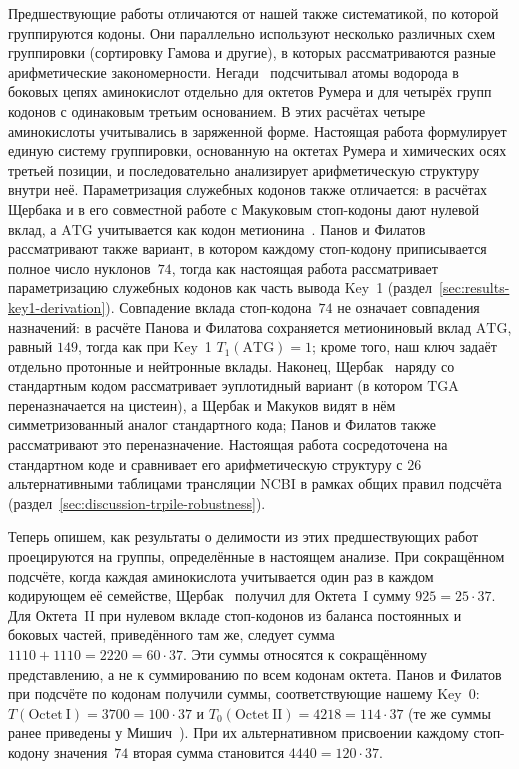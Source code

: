 \documentclass[11pt,a4paper]{article}
\renewcommand{\_}{\origunderscore\allowbreak}
\begin{document}
Предшествующие работы отличаются от нашей также
систематикой, по которой группируются кодоны. Они
параллельно используют несколько различных схем
группировки (сортировку Гамова и другие), в которых
рассматриваются разные арифметические закономерности. Негади~\cite{negadi2024} подсчитывал атомы водорода в боковых цепях
аминокислот отдельно для октетов Румера и для четырёх групп кодонов с
одинаковым третьим основанием. В этих расчётах четыре аминокислоты
учитывались в заряженной форме.
Настоящая работа формулирует
единую систему группировки, основанную на октетах
Румера и химических осях третьей позиции, и
последовательно анализирует арифметическую
структуру внутри неё. Параметризация служебных
кодонов также отличается: в расчётах Щербака и в его совместной работе с Макуковым стоп-кодоны
дают нулевой вклад, а $\mathrm{ATG}$ учитывается как кодон метионина~\cite{shcherbak1993,shcherbak2003,makukov2013}.
Панов и Филатов~\cite{panov2024} рассматривают также вариант, в котором
каждому стоп-кодону приписывается полное число нуклонов~$74$, тогда как настоящая
работа рассматривает параметризацию служебных
кодонов как часть вывода Key~1
(раздел~\ref{sec:results-key1-derivation}).
Совпадение вклада стоп-кодона~$74$ не означает
совпадения назначений: в расчёте Панова и Филатова
сохраняется метиониновый вклад $\mathrm{ATG}$,
равный $149$, тогда как при Key~1
$T_{1}(\mathrm{ATG})=1$; кроме того, наш ключ
задаёт отдельно протонные и нейтронные вклады.
Наконец, Щербак~\cite{shcherbak2003} наряду со стандартным кодом
рассматривает эуплотидный вариант (в котором
$\mathrm{TGA}$ переназначается на цистеин), а Щербак и Макуков
видят в нём симметризованный аналог стандартного кода;
Панов и Филатов также рассматривают это переназначение.
Настоящая работа сосредоточена на стандартном коде
и сравнивает его арифметическую структуру с
$26$ альтернативными таблицами трансляции NCBI
в рамках общих правил подсчёта
(раздел~\ref{sec:discussion-trpile-robustness}).

Теперь опишем, как результаты о делимости из этих
предшествующих работ проецируются на группы,
определённые в настоящем анализе. При сокращённом
подсчёте, когда каждая аминокислота учитывается
один раз в каждом кодирующем её семействе,
Щербак~\cite{shcherbak1993} получил для
Октета~I сумму $925 = 25 \cdot 37$.
Для Октета~II при нулевом вкладе стоп-кодонов
из баланса постоянных и боковых частей, приведённого там же,
следует сумма $1110+1110=2220=60\cdot37$.
Эти суммы относятся к сокращённому представлению,
а не к суммированию по всем кодонам октета.
Панов и Филатов при подсчёте по кодонам
получили суммы, соответствующие нашему Key~0:
$T(\mathrm{Octet~I}) = 3700 = 100 \cdot 37$
и $T_{0}(\mathrm{Octet~II}) = 4218 = 114 \cdot
37$ (те же суммы ранее приведены у Мишич~\cite[табл.~3]{misic2016}). При их альтернативном присвоении каждому
стоп-кодону значения~$74$ вторая сумма становится
$4440 = 120 \cdot 37$.
\end{document}
